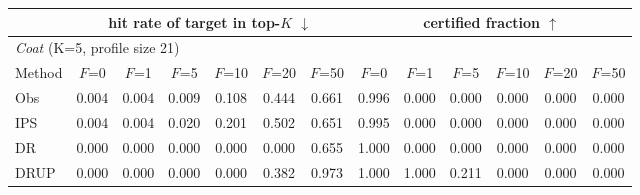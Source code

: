 \begin{tabular}{lcccccccccccc}
\toprule
 & \multicolumn{6}{c}{hit rate of target in top-$K$ $\downarrow$} & \multicolumn{6}{c}{certified fraction $\uparrow$}\\
\midrule
\multicolumn{13}{l}{\textit{Coat} (K=5, profile size 21)}\\
Method & $F$=0 & $F$=1 & $F$=5 & $F$=10 & $F$=20 & $F$=50 & $F$=0 & $F$=1 & $F$=5 & $F$=10 & $F$=20 & $F$=50\\
Obs & 0.004 & 0.004 & 0.009 & 0.108 & 0.444 & 0.661 & 0.996 & 0.000 & 0.000 & 0.000 & 0.000 & 0.000\\
IPS & 0.004 & 0.004 & 0.020 & 0.201 & 0.502 & 0.651 & 0.995 & 0.000 & 0.000 & 0.000 & 0.000 & 0.000\\
DR & 0.000 & 0.000 & 0.000 & 0.000 & 0.000 & 0.655 & 1.000 & 0.000 & 0.000 & 0.000 & 0.000 & 0.000\\
DRUP & 0.000 & 0.000 & 0.000 & 0.000 & 0.382 & 0.973 & 1.000 & 1.000 & 0.211 & 0.000 & 0.000 & 0.000\\
\bottomrule
\end{tabular}
